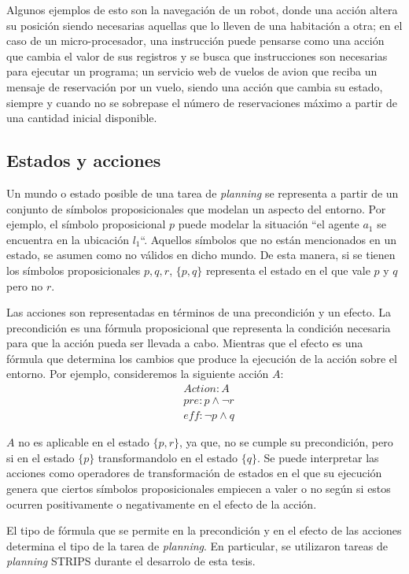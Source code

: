 Algunos ejemplos de esto son la navegación de un robot, donde una acción altera
su posición siendo necesarias aquellas que lo lleven de una habitación a otra;
en el caso de un micro-procesador, una instrucción puede pensarse como una
acción que cambia el valor de sus registros y se busca que instrucciones son
necesarias para ejecutar un programa; un servicio web de vuelos de avion que
reciba un mensaje de reservación por un vuelo, siendo una acción que cambia su
estado, siempre y cuando no se sobrepase el número de reservaciones máximo a
partir de una cantidad inicial disponible. \citep{Sandewall-2008-HandbookOK}

\subsection{Estados y acciones}

Un mundo o estado  posible de una tarea de \emph{planning} se representa a
partir de un conjunto de símbolos proposicionales que modelan un aspecto del
entorno. Por ejemplo, el símbolo proposicional $p$ puede modelar la situación
``el agente $a_1$ se encuentra en la ubicación $l_1$``. Aquellos símbolos  que
no están mencionados en un estado, se asumen como no válidos en dicho mundo. De
esta manera, si se tienen los símbolos proposicionales $p,q,r$, $\{p, q\}$
representa el estado en el que vale $p$ y $q$ pero no $r$.

Las acciones son representadas en términos de una precondición y un efecto. La
precondición es una fórmula proposicional que representa la condición necesaria
para que la acción pueda ser llevada a cabo. Mientras que el efecto es una
fórmula que determina los cambios que produce la ejecución de la acción sobre el
entorno. Por ejemplo, consideremos la siguiente acción $A$:
\begin{align*}
    & Action : A \\
    & pre : p \land \neg r \\
    & eff : \neg p \land q
\end{align*}

$A$ no es aplicable en el estado $\{p, r\}$, ya que, no se cumple su
precondición, pero si en el estado $\{p\}$ transformandolo en el estado $\{q\}$. Se puede interpretar las acciones como operadores de transformación de
estados en el que su ejecución genera que ciertos símbolos proposicionales
empiecen a valer o no según si estos ocurren positivamente o negativamente en el
efecto de la acción.

El tipo de fórmula que se permite en la precondición y en el efecto de las
acciones determina el tipo de la tarea de \emph{planning}. En particular, se
utilizaron tareas de \emph{planning} STRIPS durante el desarrolo de esta tesis.

